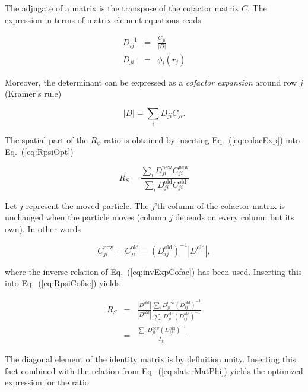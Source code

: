 The adjugate of a matrix is the transpose of the cofactor matrix $C$. The expression in terms of matrix element equations reads

\begin{eqnarray}
 D^{-1}_{ij} &=& \frac{C_{ji}}{|D|}\label{eq:invExpCofac} \\
 D_{ji} &=& \phi_i(r_j) \label{eq:slaterMatPhi}
\end{eqnarray}

Moreover, the determinant can be expressed as a \textit{cofactor expansion} around row $j$ (Kramer's rule)

\begin{equation}
\label{eq:cofacExp}
 |D| = \sum_i D_{ji} C_{ji}.
\end{equation}

The spatial part of the $R_\psi$ ratio is obtained by inserting Eq.~(\ref{eq:cofacExp}) into Eq.~(\ref{eq:RpsiOpt})

\begin{equation}
\label{eq:RpsiCofac}
 R_S = \frac{\sum_i D_{ji}^\mathrm{new}C_{ji}^\mathrm{new}}{\sum_i D_{ji}^\mathrm{old}C_{ji}^\mathrm{old}}
\end{equation}

Let $j$ represent the moved particle. The $j$'th column of the cofactor matrix is unchanged when the particle moves (column $j$ depends on every column but its own). In other words

\begin{equation}
 C_{ji}^\mathrm{new} = C_{ji}^\mathrm{old} = (D^\mathrm{old}_{ij})^{-1}|D^\mathrm{old}|,
\end{equation}

where the inverse relation of Eq.~(\ref{eq:invExpCofac}) has been used. Inserting this into Eq.~(\ref{eq:RpsiCofac}) yields

\begin{eqnarray}
  R_S &=& \frac{|D^\mathrm{old}|}{|D^\mathrm{old}|}\frac{\sum_i D_{ji}^\mathrm{new}(D_{ij}^\mathrm{old})^{-1}}{\sum_i D_{ji}^\mathrm{old}(D_{ij}^\mathrm{old})^{-1}} \nonumber\\
         &=& \frac{\sum_i D_{ji}^\mathrm{new}(D_{ij}^\mathrm{old})^{-1}}{I_{jj}} \nonumber
\end{eqnarray}

The diagonal element of the identity matrix is by definition unity. Inserting this fact combined with the relation from Eq.~(\ref{eq:slaterMatPhi}) yields the optimized expression for the ratio



